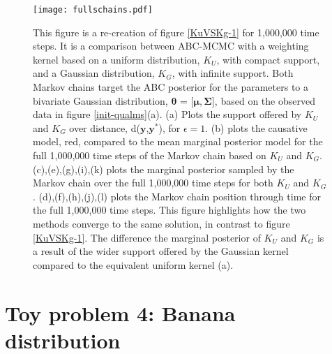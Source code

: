 \begin{figure}[H]
	\centering
	\texttt{[image: fullschains.pdf]}
	\caption{ This figure is a re-creation of figure \ref{KuVSKg-1} for 1,000,000 time steps. It is a comparison between ABC-MCMC with a weighting kernel based on a uniform distribution, $K_U$, with compact support, and a Gaussian distribution, $K_G$, with infinite support. Both Markov chains target the ABC posterior for the parameters to a bivariate Gaussian distribution, $\bm{\theta}$ = [$\bm{\mu}, \bm{\Sigma}$], based on the observed data in figure \ref{init-qualms}(a). (a) Plots the support offered by $K_U$ and $K_G$ over distance, d($\bm{y}$,$\bm{y^*}$), for $\epsilon=1$. (b) plots the causative model, red, compared to the mean marginal posterior model for the full 1,000,000 time steps of the Markov chain based on $K_U$ and $K_G$. (c),(e),(g),(i),(k) plots the marginal posterior sampled by the Markov chain over the full 1,000,000 time steps for both $K_U$ and $K_G$. (d),(f),(h),(j),(l) plots the Markov chain position through time for the full 1,000,000 time steps. This figure highlights how the two methods converge to the same solution, in contrast to figure \ref{KuVSKg-1}. The difference the marginal posterior of $K_U$ and $K_G$ is a result of the wider support offered by the Gaussian kernel compared to the equivalent uniform kernel (a).}
	\label{KuVSKg-2}
\end{figure} 

\section{Toy problem 4: Banana distribution}
\label{banana-section}

